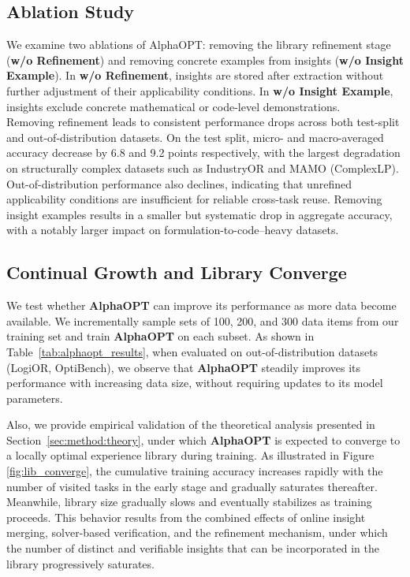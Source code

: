 \documentclass[sigconf, nonacm]{acmart}
\begin{document}
\subsection{Ablation Study}
We examine two ablations of AlphaOPT: removing the library refinement stage (\textbf{w/o Refinement}) and removing concrete examples from insights (\textbf{w/o Insight Example}). In \textbf{w/o Refinement}, insights are stored after extraction without further adjustment of their applicability conditions. In \textbf{w/o Insight Example}, insights exclude concrete mathematical or code-level demonstrations.\\
Removing refinement leads to consistent performance drops across both test-split and out-of-distribution datasets. On the test split, micro- and macro-averaged accuracy decrease by 6.8 and 9.2 points respectively, with the largest degradation on structurally complex datasets such as IndustryOR and MAMO (ComplexLP). Out-of-distribution performance also declines, indicating that unrefined applicability conditions are insufficient for reliable cross-task reuse. Removing insight examples results in a smaller but systematic drop in aggregate accuracy, with a notably larger impact on formulation-to-code–heavy datasets.



\subsection{Continual Growth and Library Converge}
We test whether \textbf{AlphaOPT} can improve its performance as more data become available. We incrementally sample sets of 100, 200, and 300 data items from our training set and train \textbf{AlphaOPT} on each subset. As shown in Table~\ref{tab:alphaopt_results}, when evaluated on out-of-distribution datasets (LogiOR, OptiBench), we observe that \textbf{AlphaOPT} steadily improves its performance with increasing data size, without requiring updates to its model parameters.


Also, we provide empirical validation of the theoretical analysis presented in Section~\ref{sec:method:theory}, under which \textbf{AlphaOPT} is expected to converge to a locally optimal experience library during training. As illustrated in Figure \ref{fig:lib_converge}, the cumulative training accuracy increases rapidly with the number of visited tasks in the early stage and gradually saturates thereafter. Meanwhile, library size gradually slows and eventually stabilizes as training proceeds. This behavior results from the combined effects of online insight merging, solver-based verification, and the refinement mechanism, under which the number of distinct and verifiable insights that can be incorporated in the library progressively saturates.
\end{document}
